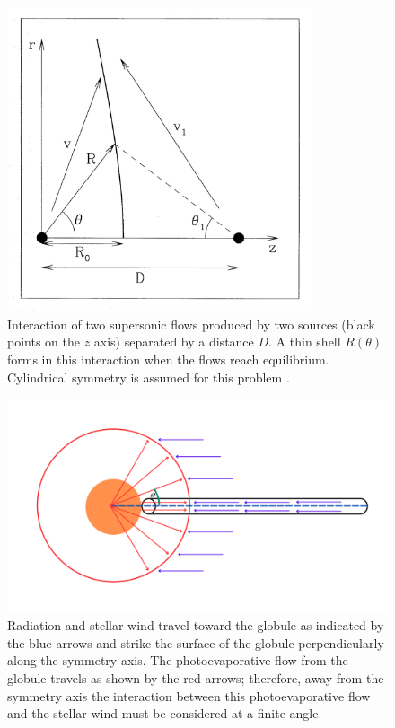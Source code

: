 \documentclass{book}
\begin{document}
\begin{figure}[htb]
    \centering    \includegraphics[width=0.8\textwidth]{images Chapter 2/C2_Canto.jpg}
    \caption{Interaction of two supersonic flows produced by two
      sources (black points on the $z$ axis) separated by a distance
      $D$. A thin shell $R(\theta)$ forms in this interaction when the
      flows reach equilibrium. Cylindrical symmetry is assumed for
      this problem \citep{Canto:1996}.}
    \label{fig:Canto1}
\end{figure}

\begin{figure}[htb]
    \centering    \includegraphics[width=\textwidth]{artesanales/ImgFi01-2.pdf}
    \caption{Radiation and stellar wind travel toward the globule as
      indicated by the blue arrows and strike the surface of the
      globule perpendicularly along the symmetry axis. The
      photoevaporative flow from the globule travels as shown by the
      red arrows; therefore, away from the symmetry axis the
      interaction between this photoevaporative flow and the stellar
      wind must be considered at a finite angle.}
    \label{fig:cilindross}
\end{figure}
\end{document}
